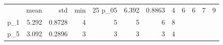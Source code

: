 \begin{tabular}{lrrrrrrr}
\toprule
 & mean & std & min & 25%
\midrule
p_05 & 6.392 & 0.8863 & 4 & 6 & 6 & 7 & 9 \\
p_1 & 5.292 & 0.8728 & 4 & 5 & 5 & 6 & 8 \\
p_5 & 3.092 & 0.2896 & 3 & 3 & 3 & 3 & 4 \\
\bottomrule
\end{tabular}
